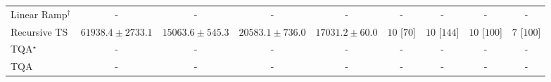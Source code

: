 \begin{tabular}{l|cccc|cccc|}
Linear Ramp$^\dagger$ & {\cellcolor[HTML]{000000}} \color[HTML]{F1F1F1} {\cellcolor{white}} \color{black} - & {\cellcolor[HTML]{000000}} \color[HTML]{F1F1F1} {\cellcolor{white}} \color{black} - & {\cellcolor[HTML]{000000}} \color[HTML]{F1F1F1} {\cellcolor{white}} \color{black} - & {\cellcolor[HTML]{000000}} \color[HTML]{F1F1F1} {\cellcolor{white}} \color{black} - & {\cellcolor[HTML]{000000}} \color[HTML]{F1F1F1} {\cellcolor{white}} \color{black} - & {\cellcolor[HTML]{000000}} \color[HTML]{F1F1F1} {\cellcolor{white}} \color{black} - & {\cellcolor[HTML]{000000}} \color[HTML]{F1F1F1} {\cellcolor{white}} \color{black} - & {\cellcolor[HTML]{000000}} \color[HTML]{F1F1F1} {\cellcolor{white}} \color{black} - \\
Recursive TS & {\cellcolor[HTML]{A43904}} \color[HTML]{F1F1F1} $61938.4\pm 2733.1$ & {\cellcolor[HTML]{FFFDD9}} \color[HTML]{000000} $15063.6\pm 545.3$ & {\cellcolor[HTML]{FFF6BA}} \color[HTML]{000000} $20583.1\pm 736.0$ & {\cellcolor[HTML]{FFFACE}} \color[HTML]{000000} $17031.2\pm 60.0$ & {\cellcolor[HTML]{49006A}} \color[HTML]{F1F1F1} $10$ [$70$] & {\cellcolor[HTML]{49006A}} \color[HTML]{F1F1F1} $10$ [$144$] & {\cellcolor[HTML]{49006A}} \color[HTML]{F1F1F1} $10$ [$100$] & {\cellcolor[HTML]{CD238F}} \color[HTML]{F1F1F1} $7$ [$100$] \\
TQA$^\star$ & {\cellcolor[HTML]{000000}} \color[HTML]{F1F1F1} {\cellcolor{white}} \color{black} - & {\cellcolor[HTML]{000000}} \color[HTML]{F1F1F1} {\cellcolor{white}} \color{black} - & {\cellcolor[HTML]{000000}} \color[HTML]{F1F1F1} {\cellcolor{white}} \color{black} - & {\cellcolor[HTML]{000000}} \color[HTML]{F1F1F1} {\cellcolor{white}} \color{black} - & {\cellcolor[HTML]{000000}} \color[HTML]{F1F1F1} {\cellcolor{white}} \color{black} - & {\cellcolor[HTML]{000000}} \color[HTML]{F1F1F1} {\cellcolor{white}} \color{black} - & {\cellcolor[HTML]{000000}} \color[HTML]{F1F1F1} {\cellcolor{white}} \color{black} - & {\cellcolor[HTML]{000000}} \color[HTML]{F1F1F1} {\cellcolor{white}} \color{black} - \\
TQA & {\cellcolor[HTML]{000000}} \color[HTML]{F1F1F1} {\cellcolor{white}} \color{black} - & {\cellcolor[HTML]{000000}} \color[HTML]{F1F1F1} {\cellcolor{white}} \color{black} - & {\cellcolor[HTML]{000000}} \color[HTML]{F1F1F1} {\cellcolor{white}} \color{black} - & {\cellcolor[HTML]{000000}} \color[HTML]{F1F1F1} {\cellcolor{white}} \color{black} - & {\cellcolor[HTML]{000000}} \color[HTML]{F1F1F1} {\cellcolor{white}} \color{black} - & {\cellcolor[HTML]{000000}} \color[HTML]{F1F1F1} {\cellcolor{white}} \color{black} - & {\cellcolor[HTML]{000000}} \color[HTML]{F1F1F1} {\cellcolor{white}} \color{black} - & {\cellcolor[HTML]{000000}} \color[HTML]{F1F1F1} {\cellcolor{white}} \color{black} - \\

\end{tabular}
